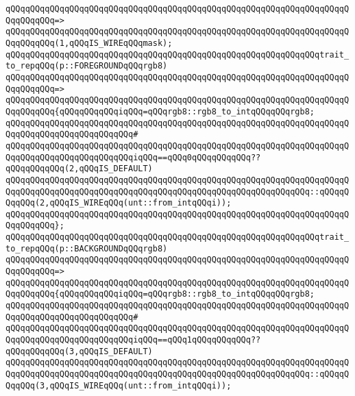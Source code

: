 \verb|qQQqqQQqqQQqqQQqqQQqqQQqqQQqqQQqqQQqqQQqqQQqqQQqqQQqqQQqqQQqqQQqqQQqqQQqqQQqqQQq=>|\newline
\verb|qQQqqQQqqQQqqQQqqQQqqQQqqQQqqQQqqQQqqQQqqQQqqQQqqQQqqQQqqQQqqQQqqQQqqQQqqQQqqQQq(1,qQQqIS_WIREqQQqmask);|\newline
\newline
\verb|qQQqqQQqqQQqqQQqqQQqqQQqqQQqqQQqqQQqqQQqqQQqqQQqqQQqqQQqqQQqqQQqtrait_to_repqQQq(p::FOREGROUNDqQQqrgb8)|\newline
\verb|qQQqqQQqqQQqqQQqqQQqqQQqqQQqqQQqqQQqqQQqqQQqqQQqqQQqqQQqqQQqqQQqqQQqqQQqqQQqqQQq=>|\newline
\verb|qQQqqQQqqQQqqQQqqQQqqQQqqQQqqQQqqQQqqQQqqQQqqQQqqQQqqQQqqQQqqQQqqQQqqQQqqQQqqQQq{qQQqqQQqqQQqiqQQq=qQQqrgb8::rgb8_to_intqQQqqQQqrgb8;|\newline
\verb|qQQqqQQqqQQqqQQqqQQqqQQqqQQqqQQqqQQqqQQqqQQqqQQqqQQqqQQqqQQqqQQqqQQqqQQqqQQqqQQqqQQqqQQqqQQqqQQq#|\newline
\verb|qQQqqQQqqQQqqQQqqQQqqQQqqQQqqQQqqQQqqQQqqQQqqQQqqQQqqQQqqQQqqQQqqQQqqQQqqQQqqQQqqQQqqQQqqQQqqQQqiqQQq==qQQq0qQQqqQQqqQQq??qQQqqQQqqQQq(2,qQQqIS_DEFAULT)|\newline
\verb|qQQqqQQqqQQqqQQqqQQqqQQqqQQqqQQqqQQqqQQqqQQqqQQqqQQqqQQqqQQqqQQqqQQqqQQqqQQqqQQqqQQqqQQqqQQqqQQqqQQqqQQqqQQqqQQqqQQqqQQqqQQqqQQqqQQq::qQQqqQQqqQQq(2,qQQqIS_WIREqQQq(unt::from_intqQQqi));|\newline
\verb|qQQqqQQqqQQqqQQqqQQqqQQqqQQqqQQqqQQqqQQqqQQqqQQqqQQqqQQqqQQqqQQqqQQqqQQqqQQqqQQq};|\newline
\newline
\verb|qQQqqQQqqQQqqQQqqQQqqQQqqQQqqQQqqQQqqQQqqQQqqQQqqQQqqQQqqQQqqQQqtrait_to_repqQQq(p::BACKGROUNDqQQqrgb8)|\newline
\verb|qQQqqQQqqQQqqQQqqQQqqQQqqQQqqQQqqQQqqQQqqQQqqQQqqQQqqQQqqQQqqQQqqQQqqQQqqQQqqQQq=>|\newline
\verb|qQQqqQQqqQQqqQQqqQQqqQQqqQQqqQQqqQQqqQQqqQQqqQQqqQQqqQQqqQQqqQQqqQQqqQQqqQQqqQQq{qQQqqQQqqQQqiqQQq=qQQqrgb8::rgb8_to_intqQQqqQQqrgb8;|\newline
\verb|qQQqqQQqqQQqqQQqqQQqqQQqqQQqqQQqqQQqqQQqqQQqqQQqqQQqqQQqqQQqqQQqqQQqqQQqqQQqqQQqqQQqqQQqqQQqqQQq#|\newline
\verb|qQQqqQQqqQQqqQQqqQQqqQQqqQQqqQQqqQQqqQQqqQQqqQQqqQQqqQQqqQQqqQQqqQQqqQQqqQQqqQQqqQQqqQQqqQQqqQQqiqQQq==qQQq1qQQqqQQqqQQq??qQQqqQQqqQQq(3,qQQqIS_DEFAULT)|\newline
\verb|qQQqqQQqqQQqqQQqqQQqqQQqqQQqqQQqqQQqqQQqqQQqqQQqqQQqqQQqqQQqqQQqqQQqqQQqqQQqqQQqqQQqqQQqqQQqqQQqqQQqqQQqqQQqqQQqqQQqqQQqqQQqqQQqqQQq::qQQqqQQqqQQq(3,qQQqIS_WIREqQQq(unt::from_intqQQqi));|\newline
